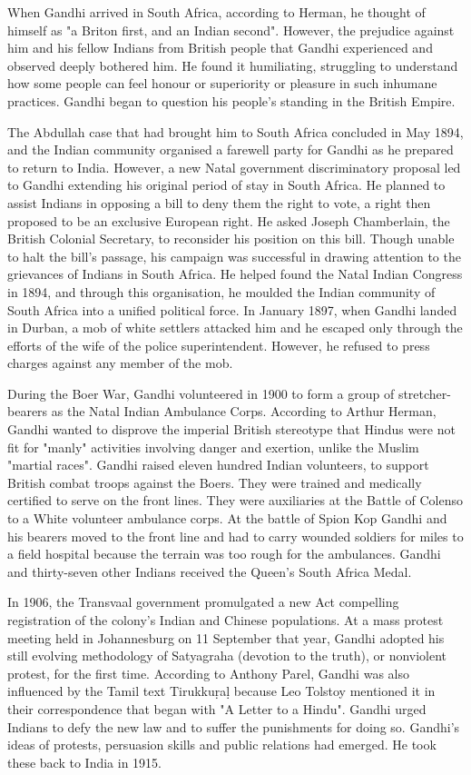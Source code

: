 When Gandhi arrived in South Africa, according to Herman, he thought of
himself as "a Briton first, and an Indian second". However, the
prejudice against him and his fellow Indians from British people that
Gandhi experienced and observed deeply bothered him. He found it
humiliating, struggling to understand how some people can feel honour or
superiority or pleasure in such inhumane practices. Gandhi began to
question his people's standing in the British Empire.

The Abdullah case that had brought him to South Africa concluded in May
1894, and the Indian community organised a farewell party for Gandhi as
he prepared to return to India. However, a new Natal government
discriminatory proposal led to Gandhi extending his original period of
stay in South Africa. He planned to assist Indians in opposing a bill to
deny them the right to vote, a right then proposed to be an exclusive
European right. He asked Joseph Chamberlain, the British Colonial
Secretary, to reconsider his position on this bill. Though unable to
halt the bill's passage, his campaign was successful in drawing
attention to the grievances of Indians in South Africa. He helped found
the Natal Indian Congress in 1894, and through this organisation, he
moulded the Indian community of South Africa into a unified political
force. In January 1897, when Gandhi landed in Durban, a mob of white
settlers attacked him and he escaped only through the efforts of the
wife of the police superintendent. However, he refused to press charges
against any member of the mob.

During the Boer War, Gandhi volunteered in 1900 to form a group of
stretcher-bearers as the Natal Indian Ambulance Corps. According to
Arthur Herman, Gandhi wanted to disprove the imperial British stereotype
that Hindus were not fit for "manly" activities involving danger and
exertion, unlike the Muslim "martial races". Gandhi raised eleven
hundred Indian volunteers, to support British combat troops against the
Boers. They were trained and medically certified to serve on the front
lines. They were auxiliaries at the Battle of Colenso to a White
volunteer ambulance corps. At the battle of Spion Kop Gandhi and his
bearers moved to the front line and had to carry wounded soldiers for
miles to a field hospital because the terrain was too rough for the
ambulances. Gandhi and thirty-seven other Indians received the Queen's
South Africa Medal.

In 1906, the Transvaal government promulgated a new Act compelling
registration of the colony's Indian and Chinese populations. At a mass
protest meeting held in Johannesburg on 11 September that year, Gandhi
adopted his still evolving methodology of Satyagraha (devotion to the
truth), or nonviolent protest, for the first time. According to Anthony
Parel, Gandhi was also influenced by the Tamil text Tirukkuṛaḷ because
Leo Tolstoy mentioned it in their correspondence that began with "A
Letter to a Hindu". Gandhi urged Indians to defy the new law and to
suffer the punishments for doing so. Gandhi's ideas of protests,
persuasion skills and public relations had emerged. He took these back
to India in 1915.

